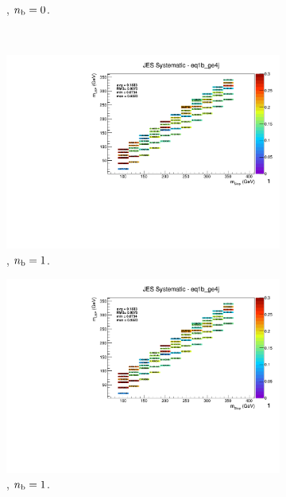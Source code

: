 \begin{figure}[ht!]
\begin{subfigure}[b]{0.32\textwidth}
    \caption{\njhigh, $n_{\text{b}} = 0$.}
    \label{fig:sms-jes-t2cc-ge4j-0b}
  \end{subfigure}\\
  \begin{subfigure}[b]{0.32\textwidth}
    \includegraphics[width=\textwidth, page=12]{Figs/sms/t2cc/v37_2/systs/T2cc_JES_eq1b_ge4j.pdf}
    \caption{\njhigh, $n_{\text{b}} = 1$.}
  \end{subfigure}
  \begin{subfigure}[b]{0.32\textwidth}
    \includegraphics[width=\textwidth, page=8]{Figs/sms/t2cc/v37_2/systs/T2cc_JES_eq1b_ge4j.pdf}
    \caption{\njhigh, $n_{\text{b}} = 1$.}
  \end{subfigure}
  \begin{subfigure}[b]{0.32\textwidth}

\end{subfigure}
\end{figure}
